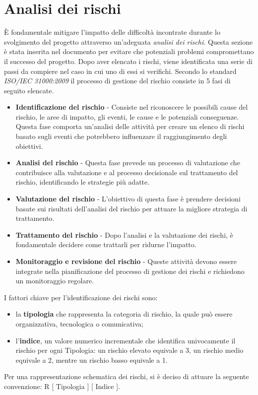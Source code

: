 \section{Analisi dei rischi} %
È fondamentale mitigare l'impatto delle difficoltà incontrate durante lo svolgimento del progetto attraverso un'adeguata \textit{analisi dei rischi}. Questa sezione è stata inserita nel documento per evitare che potenziali problemi compromettano il successo del progetto.
Dopo aver elencato i rischi, viene identificata una serie di passi da compiere nel caso in cui uno di essi si verifichi. Secondo lo standard \textit{ISO/IEC 31000:2009} il processo di gestione del rischio consiste in 5 fasi di seguito elencate.
\begin{itemize}
	\item \textbf{Identificazione del rischio} - Consiste nel riconoscere le possibili cause del rischio, le aree di impatto, gli eventi, le cause e le potenziali conseguenze. Questa fase comporta un'analisi delle attività per creare un elenco di rischi basato sugli eventi che potrebbero influenzare il raggiungimento degli obiettivi.
	\item \textbf{Analisi del rischio} - Questa fase prevede un processo di valutazione che contribuisce alla valutazione e al processo decisionale sul trattamento del rischio, identificando le strategie più adatte.
	\item \textbf{Valutazione del rischio} - L'obiettivo di questa fase è prendere decisioni basate sui risultati dell'analisi del rischio per attuare la migliore strategia di trattamento.
	\item \textbf{Trattamento del rischio} - Dopo l'analisi e la valutazione dei rischi, è fondamentale decidere come trattarli per ridurne l'impatto.
	\item \textbf{Monitoraggio e revisione del rischio} - Queste attività devono essere integrate nella pianificazione del processo di gestione dei rischi e richiedono un monitoraggio regolare.
\end{itemize}
I fattori chiave per l'identificazione dei rischi sono:
\begin{itemize}
	\item la \textbf{tipologia} che rappresenta la categoria di rischio, la quale può essere organizzativa, tecnologica o comunicativa;
	\item l'\textbf{indice}, un valore numerico incrementale che identifica univocamente il rischio per ogni Tipologia: un rischio elevato equivale a 3, un rischio medio equivale a 2, mentre un rischio basso equivale a 1.
\end{itemize}
Per una rappresentazione schematica dei rischi, si è deciso di attuare la seguente convenzione: R [ Tipologia ] [ Indice ].

